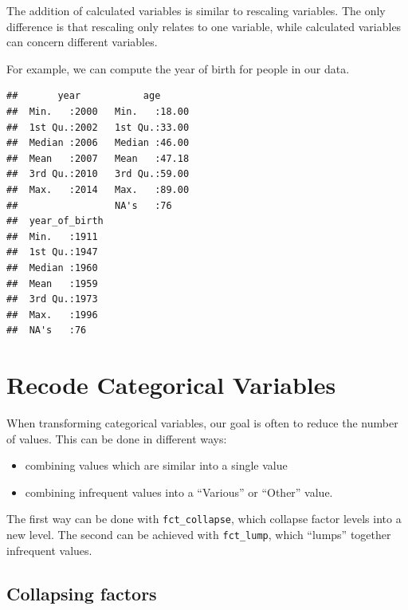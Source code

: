\documentclass[]{tufte-book}
\newenvironment{Shaded}{}{}
\newcommand{\KeywordTok}[1]{\textcolor[rgb]{0.00,0.44,0.13}{\textbf{#1}}}
\newcommand{\DataTypeTok}[1]{\textcolor[rgb]{0.56,0.13,0.00}{#1}}
\newcommand{\StringTok}[1]{\textcolor[rgb]{0.25,0.44,0.63}{#1}}
\newcommand{\OperatorTok}[1]{\textcolor[rgb]{0.40,0.40,0.40}{#1}}
\newcommand{\NormalTok}[1]{#1}
\providecommand{\tightlist}{%
  \setlength{\itemsep}{0pt}\setlength{\parskip}{0pt}}
\begin{document}
The addition of calculated variables is similar to rescaling variables.
The only difference is that rescaling only relates to one variable,
while calculated variables can concern different variables.

For example, we can compute the year of birth for people in our data.

\begin{Shaded}
\end{Shaded}

\begin{verbatim}
##       year           age       
##  Min.   :2000   Min.   :18.00  
##  1st Qu.:2002   1st Qu.:33.00  
##  Median :2006   Median :46.00  
##  Mean   :2007   Mean   :47.18  
##  3rd Qu.:2010   3rd Qu.:59.00  
##  Max.   :2014   Max.   :89.00  
##                 NA's   :76     
##  year_of_birth 
##  Min.   :1911  
##  1st Qu.:1947  
##  Median :1960  
##  Mean   :1959  
##  3rd Qu.:1973  
##  Max.   :1996  
##  NA's   :76
\end{verbatim}

\section{Recode Categorical
Variables}\label{recode-categorical-variables-1}

When transforming categorical variables, our goal is often to reduce the
number of values. This can be done in different ways:

\begin{itemize}
\tightlist
\item
  combining values which are similar into a single value
\item
  combining infrequent values into a ``Various'' or ``Other'' value.
\end{itemize}

The first way can be done with \texttt{fct\_collapse}, which collapse
factor levels into a new level. The second can be achieved with
\texttt{fct\_lump}, which ``lumps'' together infrequent values.

\subsection{Collapsing factors}\label{collapsing-factors}
\end{document}
